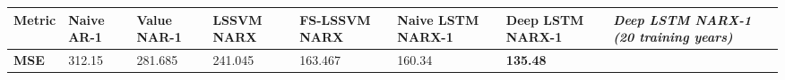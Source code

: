 \documentclass[11pt]{article}
\begin{document}
    \begin{longtable}[]{@{}llllllll@{}}
\toprule
\begin{minipage}[b]{0.10\columnwidth}\raggedright
Metric\strut
\end{minipage} & \begin{minipage}[b]{0.10\columnwidth}\raggedright
Naive AR-1\strut
\end{minipage} & \begin{minipage}[b]{0.10\columnwidth}\raggedright
Value NAR-1\strut
\end{minipage} & \begin{minipage}[b]{0.10\columnwidth}\raggedright
LSSVM NARX\strut
\end{minipage} & \begin{minipage}[b]{0.10\columnwidth}\raggedright
FS-LSSVM NARX\strut
\end{minipage} & \begin{minipage}[b]{0.10\columnwidth}\raggedright
Naive LSTM NARX-1\strut
\end{minipage} & \begin{minipage}[b]{0.10\columnwidth}\raggedright
Deep LSTM NARX-1\strut
\end{minipage} & \begin{minipage}[b]{0.10\columnwidth}\raggedright
\emph{Deep LSTM NARX-1 (20 training years)}\strut
\end{minipage}\tabularnewline
\midrule
\endhead
\begin{minipage}[t]{0.10\columnwidth}\raggedright
\textbf{MSE}\strut
\end{minipage} & \begin{minipage}[t]{0.10\columnwidth}\raggedright
312.15\strut
\end{minipage} & \begin{minipage}[t]{0.10\columnwidth}\raggedright
281.685\strut
\end{minipage} & \begin{minipage}[t]{0.10\columnwidth}\raggedright
241.045\strut
\end{minipage} & \begin{minipage}[t]{0.10\columnwidth}\raggedright
163.467\strut
\end{minipage} & \begin{minipage}[t]{0.10\columnwidth}\raggedright
160.34\strut
\end{minipage} & \begin{minipage}[t]{0.10\columnwidth}\raggedright
\textbf{135.48}\strut
\end{minipage} & \begin{minipage}[t]{0.10\columnwidth}\raggedright

\end{minipage}
\end{longtable}
\end{document}
